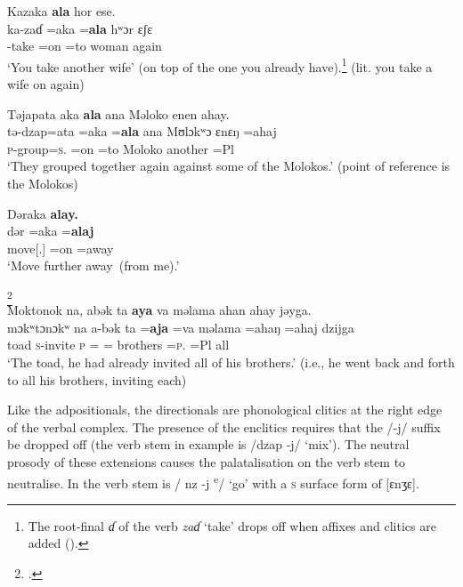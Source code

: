 \ea\label{ex:7:103}
Kazaka  \textbf{ala}  hor  ese.\\
\gll  ka-zaɗ   =aka  =\textbf{ala}     hʷɔr  ɛʃɛ\\
      {\twoS}-take   =on   =to    woman  again\\
\glt  ‘You take another wife’ (on top of the one you already have).\footnote{The root-final \textit{ɗ} of the verb \textit{zaɗ} ‘take’ drops off when affixes and clitics are added ().} (lit. you take a wife on again)\\
\z 

\ea\label{ex:7:104}
Təjapata  aka  \textbf{ala}  ana  Məloko  enen  ahay.\\
\gll  tə-dzap=ata     =aka   =\textbf{ala}     ana  Mʊlɔkʷɔ    ɛnɛŋ  =ahaj\\
      \textsc{p}-group=\textsc{s}.{\IO}   =on  =to     {\DAT}  Moloko    another  =Pl\\
\glt  ‘They grouped together again against some of the Molokos.’ (point of reference is the Molokos)\\
\z 

\ea\label{ex:7:105}
Dəraka \textbf{alay.}\\
\gll  dər      =aka  =\textbf{alaj}\\
      move[{\twoS}.{\IMP}]   =on  =away\\
\glt  ‘Move further away~(from me).’\\
\z 

\ea\label{ex:7:106}\footnote{\citealt{Friesen2003}.}\\
Moktonok na,  abək  ta  \textbf{aya}  va  məlama  ahan  ahay  jəyga.\\
\gll  mɔkʷtɔnɔkʷ na  a-bək          ta  =\textbf{aja} =va  məlama  =ahaŋ    =ahaj  dzijga\\
      toad    {\PSP}  \textsc{s}-invite   \textsc{p}  ={\PLU}  ={\PRF}  brothers  =\textsc{p}.{\POSS}  =Pl  all\\
\glt  ‘The toad, he had already invited all of his brothers.’  (i.e., he went back and forth to all his brothers, inviting each)\\
\z 

Like the adpositionals, the directionals are phonological clitics at the right edge of the verbal complex.  The presence of the enclitics requires that the /-j/ suffix be dropped off (the verb stem in example  is /dzap -j/ ‘mix’). The neutral prosody of these extensions causes the palatalisation on the verb stem to neutralise. In  the verb stem is / nz -j \textsuperscript{e}/ ‘go’ with a \textsc{s} surface form of [ɛnʒɛ].  

